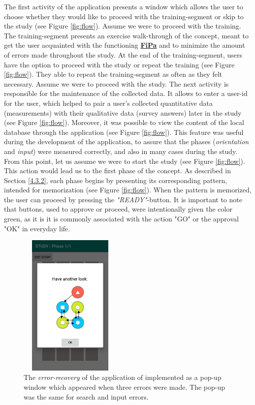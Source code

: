 The first activity of the application presents a window which allows the user to choose whether they would like to proceed with the training-segment or skip to the study (see Figure \ref{fig:flow}). Assume we were to proceed with the training. The training-segment presents an exercise walk-through of the concept, meant to get the user acquainted with the functioning \underline{\textbf{FiPa}} and to minimize the amount of errors made throughout the study. At the end of the training-segment, users have the option to proceed with the study or repeat the training (see Figure \ref{fig:flow}). They able to repeat the training-segment as often as they felt necessary. Assume we were to proceed with the study. The next activity is responsible for the maintenance of the collected data. It allows to enter a user-id for the user, which helped to pair a user's collected quantitative data (measurements) with their qualitative data (survey answers) later in the study (see Figure \ref{fig:flow}). Moreover, it was possible to view the content of the local database through the application (see Figure \ref{fig:flow}). This feature was useful during the development of the application, to assure that the phases (\textit{orientation} and \textit{input}) were measured correctly, and also in many cases during the study. From this point, let us assume we were to start the study (see Figure \ref{fig:flow}). This action would lead us to the first phase of the concept. As described in Section \ref{4.3.2}, each phase begins by presenting its corresponding pattern, intended for memorization (see Figure \ref{fig:flow}). When the pattern is memorized, the user can proceed by pressing the \textit{"READY"}-button. It is important to note that buttons, used to approve or proceed, were intentionally given the color green, as it is it is commonly associated with the action "GO" or the approval "OK" in everyday life.\\

\begin{figure}[t!]
\centering
\includegraphics[width=5cm, height=7cm]{Chapters/graphics/error.jpg}
\caption{The \textit{error-recovery} of the application of implemented as a pop-up window which appeared when three errors were made. The pop-up was the same for search and input errors.}
\label{fig:errorpopup}
\end{figure}

